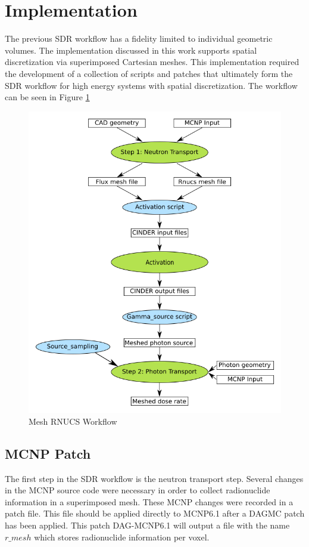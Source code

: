 \section{Implementation}
The previous SDR workflow has a fidelity limited to individual
geometric volumes. The implementation discussed in this work
supports spatial discretization via superimposed Cartesian meshes. 
This implementation required the 
development of a collection of scripts and patches that 
ultimately form the SDR workflow for high energy systems 
with spatial discretization. The workflow can be seen in Figure
\ref{mesh_rnucs}

\begin{figure}[ht]
\begin{centering}
\includegraphics[scale=0.4]{../figs/rnucs_mesh.png}
\caption{Mesh RNUCS Workflow}
\label{mesh_rnucs}
\end{centering}
\end{figure}

\subsection{MCNP Patch}
The first step in the SDR  workflow is the neutron transport step.
Several changes in the MCNP source code were necessary in order to 
collect radionuclide information in a superimposed mesh.
These MCNP changes were recorded in a patch file. This file should be applied 
directly to MCNP6.1 after a DAGMC patch has been applied.
This patch DAG-MCNP6.1 will output a file with the name $r\_mesh$ which stores 
radionuclide information per voxel.
